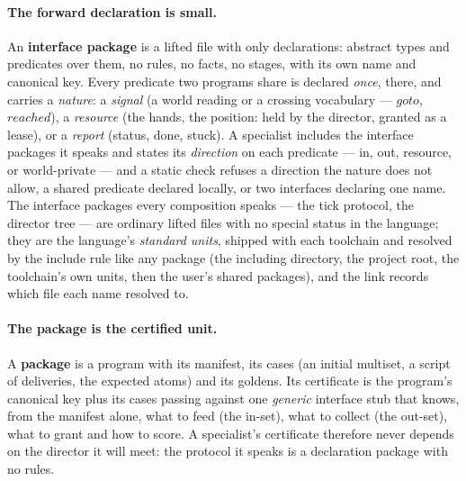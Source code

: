 \documentclass[11pt]{article}
\theoremstyle{plain}
\theoremstyle{definition}
\theoremstyle{remark}
\begin{document}
\paragraph{The forward declaration is small.} An \textbf{interface
package} is a lifted file with only declarations: abstract types and
predicates over them, no rules, no facts, no stages, with its own name
and canonical key. Every predicate two programs share is declared
\emph{once}, there, and carries a \emph{nature}: a \emph{signal} (a
world reading or a crossing vocabulary --- $\mathit{goto}$,
$\mathit{reached}$), a \emph{resource} (the hands, the position: held
by the director, granted as a lease), or a \emph{report} (status, done,
stuck). A specialist includes the interface packages it speaks and
states its \emph{direction} on each predicate --- in, out, resource, or
world-private --- and a static check refuses a direction the nature does
not allow, a shared predicate declared locally, or two interfaces
declaring one name. The interface packages every composition speaks
--- the tick protocol, the director tree --- are ordinary lifted files
with no special status in the language; they are the language's
\emph{standard units}, shipped with each toolchain and resolved by the
include rule like any package (the including directory, the project
root, the toolchain's own units, then the user's shared packages), and
the link records which file each name resolved to.

\paragraph{The package is the certified unit.} A \textbf{package} is a
program with its manifest, its cases (an initial multiset, a script of
deliveries, the expected atoms) and its goldens. Its certificate is the
program's canonical key plus its cases passing against one
\emph{generic} interface stub that knows, from the manifest alone, what
to feed (the in-set), what to collect (the out-set), what to grant and
how to score. A specialist's certificate therefore never depends on the
director it will meet: the protocol it speaks is a declaration package
with no rules.
\end{document}
